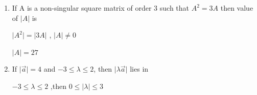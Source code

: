 \begin{enumerate}[label=\thesubsection.\arabic*, ref=\thesubsection.\theenumi]
\begin{enumerate}
\end{enumerate}

\solution 

angle between two vectors $a_1\hat{i} + b_1\hat{j} +c_1\hat{k} $ and $a_2\hat{i} +b_2\hat{j} +c_2\hat{k}$ is 

\begin{equation}
    cos\theta = \left( \frac{\overrightarrow{u}\cdot \overrightarrow{v}}{\|\mathbf{u}\|\|\mathbf{v}\|}\right) \tag{7.1}
\end{equation}


$cos\theta = \left( \frac{-1}{2}\right)$ , so $\theta =\frac{2\pi}{3}$

\item 

If A is a non-singular square matrix of order 3 such that $A^{2}=3A$ then value of $\vert{A}\vert{}$ is
\begin{enumerate}
\end{enumerate}
\solution

$\vert{A^2}\vert{} = \vert{3A}\vert{}$ , $\vert{A}\vert{} \neq 0$

$\vert{A}\vert=27$

\item

If $\vert{}\vec{a}\vert{}=4$ and $-3\le\lambda\le2$, then $\vert{\lambda \overrightarrow{a}}\vert{}$ lies in
\begin{enumerate}
\end{enumerate}
\solution

$-3\le\lambda\le2$ ,then $0\le\vert{}\lambda\vert{}\le 3$ 


\end{enumerate}
